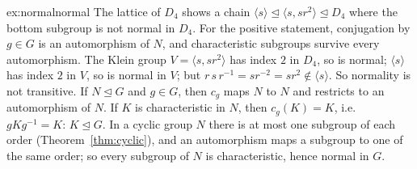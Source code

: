 \begin{solution}{ex:normalnormal}
\idea The lattice of $D_4$ shows a chain $\langle s\rangle\trianglelefteq\langle s,sr^2\rangle\trianglelefteq D_4$ where the bottom subgroup is not normal in $D_4$. For the positive statement, conjugation by $g\in G$ is an automorphism of $N$, and characteristic subgroups survive every automorphism.
\writeup The Klein group $V=\langle s,sr^2\rangle$ has index $2$ in $D_4$, so is normal; $\langle s\rangle$ has index $2$ in $V$, so is normal in $V$; but $r\,s\,r^{-1}=sr^{-2}=sr^2\notin\langle s\rangle$. So normality is not transitive.
If $N\trianglelefteq G$ and $g\in G$, then $c_g$ maps $N$ to $N$ and restricts to an automorphism of $N$. If $K$ is characteristic in $N$, then $c_g(K)=K$, i.e.\ $gKg^{-1}=K$: $K\trianglelefteq G$. In a cyclic group $N$ there is at most one subgroup of each order (Theorem~\ref{thm:cyclic}), and an automorphism maps a subgroup to one of the same order; so every subgroup of $N$ is characteristic, hence normal in $G$.
\end{solution}

